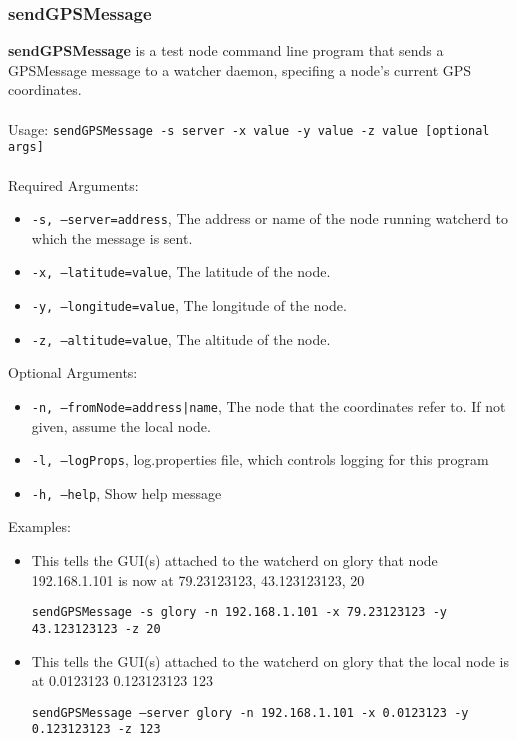 \newpage
\label{sendGPSMessage}
\subsubsection{sendGPSMessage}
{\bf sendGPSMessage} is a test node command line program that sends a GPSMessage message to a watcher daemon, specifing a node's current GPS coordinates.
\\\\
Usage: 
{\tt sendGPSMessage -s server -x value -y value -z value [optional args]}
\\\\
Required Arguments:
\begin{itemize}
\item {\tt -s, --server=address}, The address or name of the node running watcherd to which the message is sent.
\item {\tt -x, --latitude=value}, The latitude of the node.
\item {\tt -y, --longitude=value}, The longitude of the node.
\item {\tt -z, --altitude=value}, The altitude of the node.
\end{itemize}
Optional Arguments:
\begin{itemize}
\item {\tt -n, --fromNode=address|name}, The node that the coordinates refer to. If not given, assume the local node. 
\item {\tt -l, --logProps}, log.properties file, which controls logging for this program
\item {\tt -h, --help}, Show help message
\end{itemize}
Examples:
\begin{itemize}
\item This tells the GUI(s) attached to the watcherd on glory that node 192.168.1.101 is now at 79.23123123, 43.123123123, 20

{\tt sendGPSMessage -s glory -n 192.168.1.101 -x 79.23123123 -y 43.123123123 -z 20}

\item This tells the GUI(s) attached to the watcherd on glory that the local node is at 0.0123123 0.123123123 123

{\tt sendGPSMessage --server glory -n 192.168.1.101 -x 0.0123123 -y 0.123123123 -z 123}

\end{itemize}
